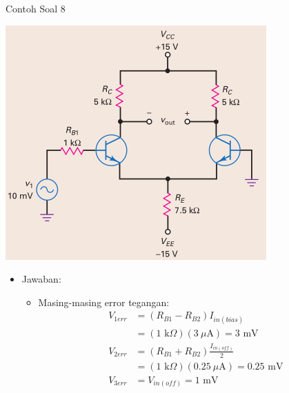 \documentclass[aspectratio=169]{beamer}
\begin{document}
\begin{frame}{Contoh Soal 8}
	\begin{multicols}{2}
		\begin{center}
			\includegraphics[height=0.7\textheight]{gambar/01.latihan_soal_8}
		\end{center}
		\columnbreak
		\begin{itemize}
			\item Jawaban:
			\begin{itemize}
				\item Masing-masing error tegangan:
				\begin{align*}
					V_{1err} &= (R_{B1} - R_{B2}) I_{in(bias)} \\
					&= (1 \text{ k}\Omega)(3~\mu\text{A}) = 3 \text{ mV} \\
					V_{2err} &= (R_{B1} + R_{B2}) \frac{I_{in(off)}}{2} \\
					&= (1 \text{ k}\Omega)(0.25~\mu\text{A}) = 0.25 \text{ mV} \\
					V_{3err} &= V_{in(off)} = 1 \text{ mV}
				\end{align*}
			\end{itemize}
		\end{itemize}
	\end{multicols}
\end{frame}
\end{document}

